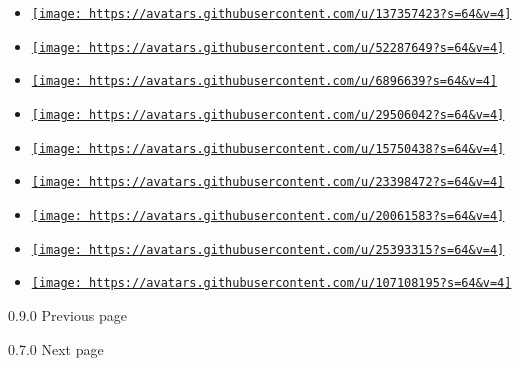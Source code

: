 \begin{itemize}
\item
  \href{https://github.com/lolstork}{\texttt{[image: https://avatars.githubusercontent.com/u/137357423?s=64\&v=4]}}
\item
  \href{https://github.com/lukas-loering}{\texttt{[image: https://avatars.githubusercontent.com/u/52287649?s=64\&v=4]}}
\item
  \href{https://github.com/owiecc}{\texttt{[image: https://avatars.githubusercontent.com/u/6896639?s=64\&v=4]}}
\item
  \href{https://github.com/pavelzw}{\texttt{[image: https://avatars.githubusercontent.com/u/29506042?s=64\&v=4]}}
\item
  \href{https://github.com/raphCode}{\texttt{[image: https://avatars.githubusercontent.com/u/15750438?s=64\&v=4]}}
\item
  \href{https://github.com/sudormrfbin}{\texttt{[image: https://avatars.githubusercontent.com/u/23398472?s=64\&v=4]}}
\item
  \href{https://github.com/t-rapp}{\texttt{[image: https://avatars.githubusercontent.com/u/20061583?s=64\&v=4]}}
\item
  \href{https://github.com/zicklag}{\texttt{[image: https://avatars.githubusercontent.com/u/25393315?s=64\&v=4]}}
\item
  \href{https://github.com/zyoshoka}{\texttt{[image: https://avatars.githubusercontent.com/u/107108195?s=64\&v=4]}}
\end{itemize}

\href{/docs/changelog/0.9.0/}{\pandocbounded{}}

{ 0.9.0 } { Previous page }

\href{/docs/changelog/0.7.0/}{\pandocbounded{}}

{ 0.7.0 } { Next page }
